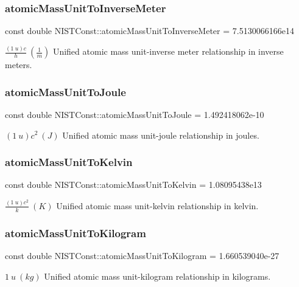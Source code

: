 \subsubsection{\texorpdfstring{atomic\+Mass\+Unit\+To\+Inverse\+Meter}{atomicMassUnitToInverseMeter}}
{\footnotesize\ttfamily const double N\+I\+S\+T\+Const\+::atomic\+Mass\+Unit\+To\+Inverse\+Meter = 7.\+5130066166e14}

$\frac{(1\ u)c}{h} \ (\frac{1}{m})$ Unified atomic mass unit-\/inverse meter relationship in inverse meters. \mbox{\label{group___n_i_s_t_const-_atomic_mass_unit_gaea7c1916a35df8824ac6a67be3f65f33}} 
\subsubsection{\texorpdfstring{atomic\+Mass\+Unit\+To\+Joule}{atomicMassUnitToJoule}}
{\footnotesize\ttfamily const double N\+I\+S\+T\+Const\+::atomic\+Mass\+Unit\+To\+Joule = 1.\+492418062e-\/10}

$(1\ u)c^2 \ (J)$ Unified atomic mass unit-\/joule relationship in joules. \mbox{\label{group___n_i_s_t_const-_atomic_mass_unit_gaf9c3a2dfd69d4e74cee3361abd7d7ecf}} 
\subsubsection{\texorpdfstring{atomic\+Mass\+Unit\+To\+Kelvin}{atomicMassUnitToKelvin}}
{\footnotesize\ttfamily const double N\+I\+S\+T\+Const\+::atomic\+Mass\+Unit\+To\+Kelvin = 1.\+08095438e13}

$\frac{(1\ u)c^2}{k} \ (K)$ Unified atomic mass unit-\/kelvin relationship in kelvin. \mbox{\label{group___n_i_s_t_const-_atomic_mass_unit_gafdd40d93803d15e1ff887dc12c49ca99}} 
\subsubsection{\texorpdfstring{atomic\+Mass\+Unit\+To\+Kilogram}{atomicMassUnitToKilogram}}
{\footnotesize\ttfamily const double N\+I\+S\+T\+Const\+::atomic\+Mass\+Unit\+To\+Kilogram = 1.\+660539040e-\/27}

$1\ u\ (kg)$ Unified atomic mass unit-\/kilogram relationship in kilograms. 